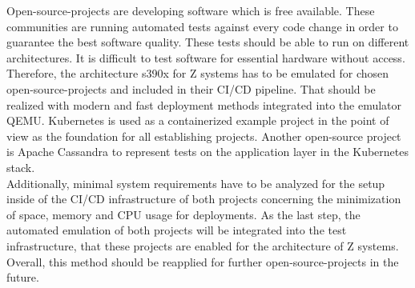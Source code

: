 Open-source-projects are developing software which is free available. These communities are running automated tests against every code change in order to guarantee the best software quality. 
These tests should be able to run on different architectures. It is difficult to test software for essential hardware without access. Therefore, the architecture \gls{s390x} for \gls{Z systems} has to be emulated for chosen open-source-projects and included in their \gls{CI/CD} pipeline. That should be realized with modern and fast deployment methods integrated into the \gls{emulator} QEMU. Kubernetes is used as a \gls{containerized} example project in the point of view as the foundation for all establishing projects. Another open-source project is Apache Cassandra to represent tests on the \gls{application layer} in the Kubernetes stack. \\
Additionally, minimal system requirements have to be analyzed for the setup inside of the CI/CD infrastructure of both projects concerning the minimization of space, memory and CPU usage for deployments. As the last step, the automated emulation of both projects will be integrated into the test infrastructure, that these projects are enabled for the architecture of Z systems. Overall, this method should be reapplied for further open-source-projects in the future.


